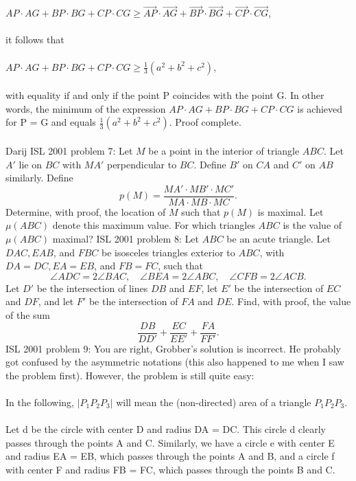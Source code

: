 $AP\cdot AG+BP\cdot BG+CP\cdot CG\geq \overrightarrow{AP}\cdot \overrightarrow{AG}+\overrightarrow{BP}\cdot \overrightarrow{BG}+\overrightarrow{CP}\cdot \overrightarrow{CG}$, \\\\
it follows that \\\\
$AP\cdot AG+BP\cdot BG+CP\cdot CG\geq \frac13 \left( a^2+b^2+c^2\right) $, \\\\
with equality if and only if the point P coincides with the point G. In other words, the minimum of the expression $AP\cdot AG+BP\cdot BG+CP\cdot CG$ is achieved for P = G and equals $\frac13 \left( a^2+b^2+c^2\right) $. Proof complete. \\\\
Darij 
ISL 2001 problem 7:  Let $M$ be a point in the interior of triangle $ABC$. Let $A'$ lie on $BC$ with $MA'$ perpendicular to $BC$. Define $B'$ on $CA$ and $C'$ on $AB$ similarly.  Define
\[ p(M) = \frac{MA' \cdot MB' \cdot MC'}{MA \cdot MB \cdot MC}. \]
Determine, with proof, the location of $M$ such that $p(M)$ is maximal.  Let $\mu(ABC)$ denote this maximum value.  For which triangles $ABC$ is the value of $\mu(ABC)$ maximal? 
ISL 2001 problem 8:  Let $ABC$ be an acute triangle.  Let $DAC,EAB$, and $FBC$ be isosceles triangles exterior to $ABC$, with $DA=DC, EA=EB$, and $FB=FC$, such that
\[ \angle ADC = 2\angle BAC, \quad \angle BEA= 2 \angle ABC, \quad
\angle CFB = 2 \angle ACB. \]
Let $D'$  be the intersection of lines $DB$ and $EF$, let $E'$ be the intersection of $EC$ and $DF$, and let $F'$   be the intersection of $FA$ and $DE$. Find, with proof, the value of the sum
\[ \frac{DB}{DD'}+\frac{EC}{EE'}+\frac{FA}{FF'}. \] 
ISL 2001 problem 9:  You are right, Grobber's solution is incorrect. He probably got confused by the asymmetric notations (this also happened to me when I saw the problem first). However, the problem is still quite easy: \\\\
In the following, $\left|P_1P_2P_3\right|$ will mean the (non-directed) area of a triangle $P_1P_2P_3$. \\\\
Let d be the circle with center D and radius DA = DC. This circle d clearly passes through the points A and C. Similarly, we have a circle e with center E and radius EA = EB, which passes through the points A and B, and a circle f with center F and radius FB = FC, which passes through the points B and C. \\\\
